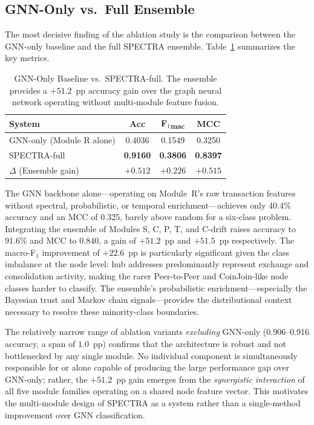 \documentclass[journal]{IEEEtran}
\begin{document}

\subsection{GNN-Only vs.\ Full Ensemble}
\label{subsec:gnn_vs_ensemble}

The most decisive finding of the ablation study is the comparison between
the GNN-only baseline and the full SPECTRA ensemble.
Table~\ref{tab:gnn_vs_full} summarizes the key metrics.

\begin{table}[t]
  \centering
  \renewcommand{\arraystretch}{1.15}
  \caption{GNN-Only Baseline vs.\ SPECTRA-full.
           The ensemble provides a $+51.2$~pp accuracy gain over the
           graph neural network operating without multi-module feature fusion.}
  \label{tab:gnn_vs_full}
  \begin{tabular}{@{}lccc@{}}
    \toprule
    \textbf{System} & \textbf{Acc} & \textbf{F$_1$\textsubscript{mac}} & \textbf{MCC} \\
    \midrule
    GNN-only (Module R alone) & 0.4036 & 0.1549 & 0.3250 \\
    SPECTRA-full              & \textbf{0.9160} & \textbf{0.3806} & \textbf{0.8397} \\
    \midrule
    $\Delta$ (Ensemble gain)  & $+0.512$ & $+0.226$ & $+0.515$ \\
    \bottomrule
  \end{tabular}
\end{table}

The GNN backbone alone—operating on Module~R's raw transaction features
without spectral, probabilistic, or temporal enrichment—achieves only
40.4\% accuracy and an MCC of 0.325, barely above random for a six-class
problem.
Integrating the ensemble of Modules S, C, P, T, and C-drift raises accuracy
to 91.6\% and MCC to 0.840, a gain of $+51.2$~pp and $+51.5$~pp
respectively.
The macro-F$_1$ improvement of $+22.6$~pp is particularly significant given
the class imbalance at the node level: hub addresses predominantly represent
exchange and consolidation activity, making the rarer Peer-to-Peer and
CoinJoin-like node classes harder to classify.
The ensemble's probabilistic enrichment—especially the Bayesian trust and
Markov chain signals—provides the distributional context necessary to
resolve these minority-class boundaries.

The relatively narrow range of ablation variants \emph{excluding} GNN-only
(0.906--0.916 accuracy, a span of $1.0$~pp) confirms that the architecture
is robust and not bottlenecked by any single module.
No individual component is simultaneously responsible for or alone capable
of producing the large performance gap over GNN-only; rather, the $+51.2$~pp
gain emerges from the \emph{synergistic interaction} of all five module
families operating on a shared node feature vector.
This motivates the multi-module design of SPECTRA as a system rather than a
single-method improvement over GNN classification.
\end{document}

